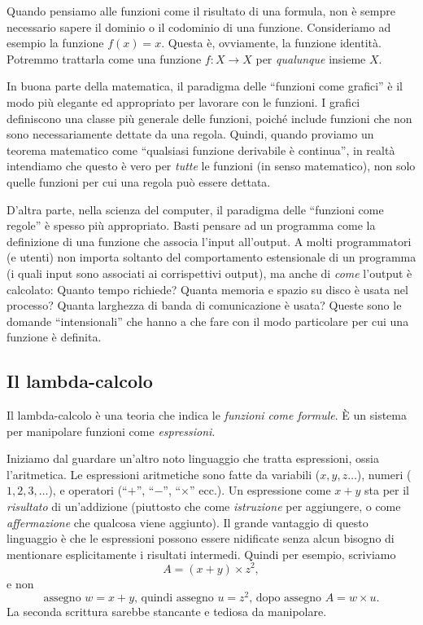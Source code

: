 \documentclass{article}
\begin{document}
Quando pensiamo alle funzioni come il risultato di una formula, non
\`e sempre necessario sapere il dominio o il codominio di una funzione. Consideriamo
ad esempio la funzione $f(x)=x$. Questa \`e, ovviamente, la funzione
identit\`a. Potremmo trattarla come una funzione $f:X\to X$ per {\em qualunque} insieme $X$.

In buona parte della matematica, il paradigma delle 
``funzioni come grafici'' \`e il modo pi\`u elegante ed appropriato per lavorare con le funzioni. 
I grafici definiscono una classe pi\`u generale delle funzioni, poiché include
funzioni che non sono necessariamente dettate da una regola. Quindi, quando
proviamo un teorema matematico come ``qualsiasi funzione derivabile
\`e continua'', in realt\`a intendiamo che questo \`e vero per {\em tutte} le funzioni
(in senso matematico), non solo quelle funzioni per cui una regola pu\`o essere dettata.

D'altra parte, nella scienza del computer, il paradigma delle
``funzioni come regole'' \`e spesso pi\`u appropriato. Basti pensare ad un programma 
come la definizione di una funzione che associa l'input all'output. A molti programmatori
(e utenti) non importa soltanto del comportamento estensionale di 
un programma (i quali input sono associati ai corrispettivi output),
ma  anche di {\em come} l'output \`e calcolato: Quanto tempo richiede?
Quanta memoria e spazio su disco \`e usata nel processo? Quanta larghezza di 
banda di comunicazione \`e usata? Queste sono le domande ``intensionali'' che 
hanno a che fare con il modo particolare
per cui una funzione \`e definita.

\subsection{Il lambda-calcolo}

Il lambda-calcolo \`e una teoria che indica le {\em funzioni come formule}. \`E un
sistema per manipolare funzioni come {\em espressioni}.

Iniziamo dal guardare un'altro noto linguaggio che tratta espressioni, ossia l'aritmetica. 
Le espressioni aritmetiche sono fatte da variabili ($x,y,z\ldots$), 
numeri ($1,2,3,\ldots$), e operatori (``$+$'', ``$-$'', ``$\times$'' ecc.). 
Un espressione come $x+y$ sta per il {\em risultato} di un'addizione
(piuttosto che come {\em istruzione} per aggiungere, o come {\em affermazione} 
che qualcosa viene aggiunto). Il grande vantaggio di questo linguaggio 
\`e che le espressioni possono essere nidificate senza alcun bisogno 
di mentionare esplicitamente i risultati intermedi. Quindi
per esempio, scriviamo
\[   A = (x+y)\times z^2,   
\]
e non 
\[   \mbox{assegno $w=x+y$, quindi assegno $u=z^2$, dopo assegno $A=w\times u$.}    
\]
La seconda scrittura sarebbe stancante e tediosa da manipolare.
\end{document}
